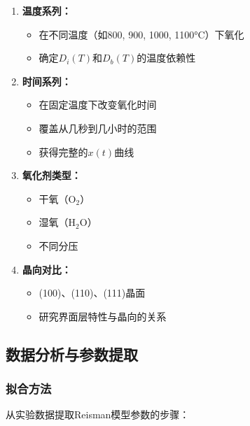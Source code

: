 \documentclass[UTF8,12pt,a4paper]{ctexart}
\begin{document}
\begin{enumerate}
    \item \textbf{温度系列：}
    \begin{itemize}
        \item 在不同温度（如800, 900, 1000, 1100°C）下氧化
        \item 确定$D_i(T)$和$D_b(T)$的温度依赖性
    \end{itemize}
    
    \item \textbf{时间系列：}
    \begin{itemize}
        \item 在固定温度下改变氧化时间
        \item 覆盖从几秒到几小时的范围
        \item 获得完整的$x(t)$曲线
    \end{itemize}
    
    \item \textbf{氧化剂类型：}
    \begin{itemize}
        \item 干氧（O$_2$）
        \item 湿氧（H$_2$O）
        \item 不同分压
    \end{itemize}
    
    \item \textbf{晶向对比：}
    \begin{itemize}
        \item (100)、(110)、(111)晶面
        \item 研究界面层特性与晶向的关系
    \end{itemize}
\end{enumerate}

\subsection{数据分析与参数提取}

\subsubsection{拟合方法}

从实验数据提取Reisman模型参数的步骤：
\end{document}
